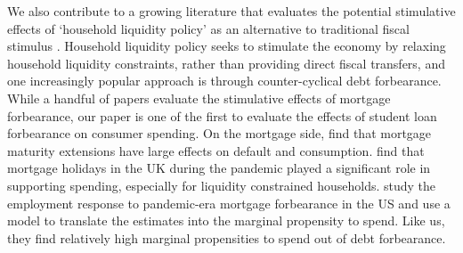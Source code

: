\documentclass[12pt]{article}
\begin{document}
We also contribute to a growing literature that evaluates the potential stimulative effects of `household liquidity policy' as an alternative to traditional fiscal stimulus \citep{schneider2024household}. Household liquidity policy seeks to stimulate the economy by relaxing household liquidity constraints, rather than providing direct fiscal transfers, and one increasingly popular approach is through counter-cyclical debt forbearance. 
While a handful of papers evaluate the stimulative effects of mortgage forbearance, our paper is one of the first to evaluate the effects of student loan forbearance on consumer spending. 
On the mortgage side, \cite{ganong2020liquidity} find that mortgage maturity extensions have large effects on default and consumption. \cite{albuquerque2022consumption} find that mortgage holidays in the UK during the pandemic played a significant role in supporting spending, especially for liquidity constrained households. \cite{lee2023household} study the employment response to pandemic-era mortgage forbearance in the US and use a model to translate the estimates into the marginal propensity to spend. Like us, they find relatively high marginal propensities to spend out of debt forbearance. 
\end{document}
